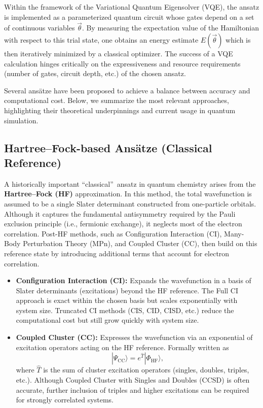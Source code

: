 Within the framework of the Variational Quantum Eigensolver (VQE), the ansatz is implemented as a parameterized quantum circuit whose gates depend on a set of continuous variables $\vec{\theta}$. By measuring the expectation value of the Hamiltonian with respect to this trial state, one obtains an energy estimate $E(\vec{\theta})$ which is then iteratively minimized by a classical optimizer. The success of a VQE calculation hinges critically on the expressiveness and resource requirements (number of gates, circuit depth, etc.) of the chosen ansatz.

Several ans\"{a}tze have been proposed to achieve a balance between accuracy and computational cost. Below, we summarize the most relevant approaches, highlighting their theoretical underpinnings and current usage in quantum simulation.

\subsection{Hartree--Fock-based Ans\"{a}tze (Classical Reference)}
A historically important \textquotedblleft classical\textquotedblright\ ansatz in quantum chemistry arises from the \textbf{Hartree--Fock (HF)} approximation. In this method, the total wavefunction is assumed to be a single Slater determinant constructed from one-particle orbitals. Although it captures the fundamental antisymmetry required by the Pauli exclusion principle (i.e., fermionic exchange), it neglects most of the electron correlation. Post-HF methods, such as Configuration Interaction (CI), Many-Body Perturbation Theory (MPn), and Coupled Cluster (CC), then build on this reference state by introducing additional terms that account for electron correlation.  

\begin{itemize}
    \item \textbf{Configuration Interaction (CI):} Expands the wavefunction in a basis of Slater determinants (excitations) beyond the HF reference. The Full CI approach is exact within the chosen basis but scales exponentially with system size. Truncated CI methods (CIS, CID, CISD, etc.) reduce the computational cost but still grow quickly with system size.

    \item \textbf{Coupled Cluster (CC):} Expresses the wavefunction via an exponential of excitation operators acting on the HF reference. Formally written as 
    \[
       |\Psi_{\mathrm{CC}}\rangle = e^{\hat{T}}|\Phi_{\mathrm{HF}}\rangle,
    \]
    where $\hat{T}$ is the sum of cluster excitation operators (singles, doubles, triples, etc.). Although Coupled Cluster with Singles and Doubles (CCSD) is often accurate, further inclusion of triples and higher excitations can be required for strongly correlated systems.
\end{itemize}

